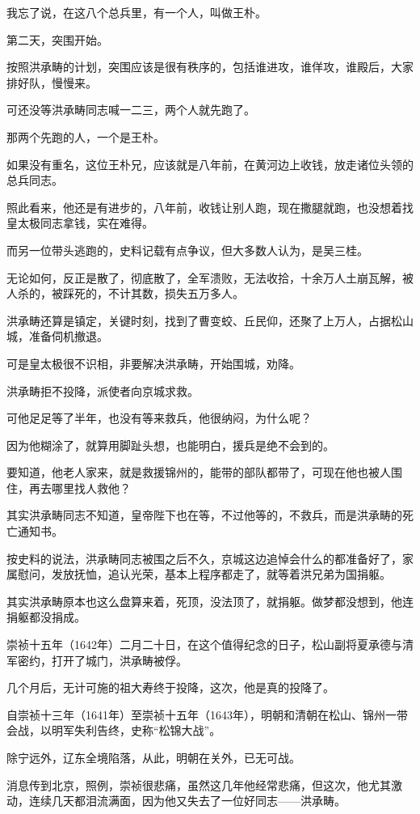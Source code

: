 \begin{multicols}{\theparacolNo}
		我忘了说，在这八个总兵里，有一个人，叫做王朴。

		第二天，突围开始。

		按照洪承畴的计划，突围应该是很有秩序的，包括谁进攻，谁佯攻，谁殿后，大家排好队，慢慢来。

		可还没等洪承畴同志喊一二三，两个人就先跑了。

		那两个先跑的人，一个是王朴。

		如果没有重名，这位王朴兄，应该就是八年前，在黄河边上收钱，放走诸位头领的总兵同志。

		照此看来，他还是有进步的，八年前，收钱让别人跑，现在撒腿就跑，也没想着找皇太极同志拿钱，实在难得。

		而另一位带头逃跑的，史料记载有点争议，但大多数人认为，是吴三桂。

		无论如何，反正是散了，彻底散了，全军溃败，无法收拾，十余万人土崩瓦解，被人杀的，被踩死的，不计其数，损失五万多人。

		洪承畴还算是镇定，关键时刻，找到了曹变蛟、丘民仰，还聚了上万人，占据松山城，准备伺机撤退。

		可是皇太极很不识相，非要解决洪承畴，开始围城，劝降。

		洪承畴拒不投降，派使者向京城求救。

		可他足足等了半年，也没有等来救兵，他很纳闷，为什么呢？

		因为他糊涂了，就算用脚趾头想，也能明白，援兵是绝不会到的。

		要知道，他老人家来，就是救援锦州的，能带的部队都带了，可现在他也被人围住，再去哪里找人救他？

		其实洪承畴同志不知道，皇帝陛下也在等，不过他等的，不救兵，而是洪承畴的死亡通知书。

		按史料的说法，洪承畴同志被围之后不久，京城这边追悼会什么的都准备好了，家属慰问，发放抚恤，追认光荣，基本上程序都走了，就等着洪兄弟为国捐躯。

		其实洪承畴原本也这么盘算来着，死顶，没法顶了，就捐躯。做梦都没想到，他连捐躯都没捐成。

		崇祯十五年（1642年）二月二十日，在这个值得纪念的日子，松山副将夏承德与清军密约，打开了城门，洪承畴被俘。

		几个月后，无计可施的祖大寿终于投降，这次，他是真的投降了。

		自崇祯十三年（1641年）至崇祯十五年（1643年），明朝和清朝在松山、锦州一带会战，以明军失利告终，史称“松锦大战”。

		除宁远外，辽东全境陷落，从此，明朝在关外，已无可战。

		消息传到北京，照例，崇祯很悲痛，虽然这几年他经常悲痛，但这次，他尤其激动，连续几天都泪流满面，因为他又失去了一位好同志——洪承畴。


\end{multicols}
